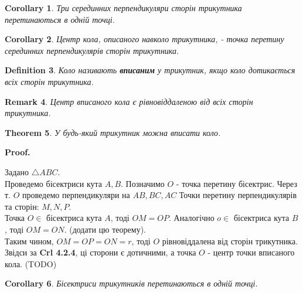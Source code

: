 \documentclass[a4paper, 10pt]{article}
\makeatletter
\def\qed{$\blacksquare$}
\theoremstyle{theoremdd}
\newtheorem{theorem}{Theorem}[subsection]
\theoremstyle{theoremdd}
\theoremstyle{theoremdd}
\newtheorem{definition}[theorem]{Definition}
\theoremstyle{theoremdd}
\theoremstyle{theoremdd}
\theoremstyle{theoremdd}
\theoremstyle{theoremdd}
\newtheorem{remark}[theorem]{Remark}
\theoremstyle{theoremdd}
\theoremstyle{theoremdd}
\newtheorem{corollary}[theorem]{Corollary}
\renewenvironment{proof}[1][Proof.\\]{\par
\pushQED{\hfill \qed}%
\normalfont \topsep6\p@\@plus6\p@\relax
\trivlist
\item\relax
{\bfseries
#1\@addpunct{.}}\hspace\labelsep\ignorespaces
}{%
\popQED\endtrivlist\@endpefalse
}
\makeatother
\begin{document}
\begin{corollary}
Три серединних перпендикуляри сторін трикутника перетинаються в одній точці.
\end{corollary}

\begin{corollary}
Центр кола, описаного навколо трикутника, - точка перетину серединних перпендикулярів сторін трикутника.
\end{corollary}

\begin{definition}
Коло називають \textbf{вписаним} у трикутник, якщо коло дотикається всіх сторін трикутника.
\begin{figure}[H]
\centering
{}
\end{figure}
\end{definition}

\begin{remark}
Центр вписаного кола є рівновіддаленою від всіх сторін трикутника.
\end{remark}

\begin{theorem}
У будь-який трикутник можна вписати коло.
\end{theorem}

\begin{proof}
Задано $\triangle ABC$.\\
Проведемо бісектриси кута $A,B$. Позначимо $O$ - точка перетину бісектрис. Через т. $O$ проведемо перпендикуляри на $AB,BC,AC$ Точки перетину перпендикулярів та сторін: $M,N,P$.\\
Точка $O \in$ бісектриса кута $A$, тоді $OM = OP$. Аналогічно $o \in$ бісектриса кута $B$, тоді $OM = ON$. (додати цю теорему).\\
Таким чином, $OM = OP = ON = r$, тоді $O$ рівновіддалена від сторін трикутника. Звідси за \textbf{Crl 4.2.4}, ці сторони є дотичними, а точка $O$ - центр точки вписаного кола.
(TODO)
\end{proof}

\begin{corollary}
Бісектриси трикутників перетинаються в одній точці.
\end{corollary}
\end{document}
